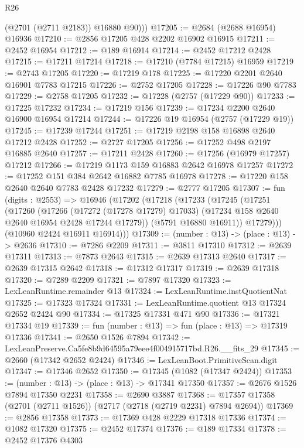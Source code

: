 \begin{lexlean}{R26}
\begin{coremodule}
          (@2701 (@2711 @2183))
          @16880
          @90)))
@17205 := @2684 (@2688 @16954) @16936
@17210 := @2856 @17205 @428 @2202 @16902 @16915
@17211 := @2452 @16954
@17212 := @189 @16914
@17214 := @2452 @17212 @2428
@17215 := @17211 @17214
@17218 := @17210 (@7784 @17215) @16959
@17219 := @2743 @17205
@17220 := @17219 @178
@17225 := @17220 @2201 @2640 @16901 @7783 @17215
@17226 := @2752 @17205
@17228 := @17226 @90 @7783
@17229 := @2758 @17205
@17232 := @17228 (@2757 (@17229 @90))
@17233 := @17225 @17232
@17234 := @17219 @156
@17239 := @17234 @2200 @2640 @16900 @16954 @17214
@17244 := @17226 @19 @16954 (@2757 (@17229 @19))
@17245 := @17239 @17244
@17251 := @17219 @2198 @158 @16898 @2640 @17212 @2428
@17252 := @2727 @17205
@17256 := @17252 @498 @2197 @16885 @2640
@17257 := @17211 @2428
@17260 := @17256 (@16979 @17257) @17212
@17266 := @17219 @1173 @159 @16883 @2642 @16978 @17257
@17272 := @17252 @151 @384 @2642 @16882 @7785 @16978
@17278 := @17220 @158 @2640 @2640 @7783 @2428 @17232
@17279 := @2777 @17205
@17307 := fun (digits : @2553) =>
  @16946
    (@17202
      (@17218
        (@17233
          (@17245
            (@17251
              (@17260
                (@17266
                  (@17272 (@17278 @17279) @17033)
                  (@17234 @158 @2640 @2640 @16954 @2428 @17244 @17279))
                (@5791 @16880 @16911))
              @17279)))
        (@10960 @2424 @16911 @16914)))
@17309 := (number : @13) -> (place : @13) -> @2636
@17310 := @7286 @2209
@17311 := @3811 @17310
@17312 := @2639 @17311
@17313 := @7873 @2643
@17315 := @2639 @17313 @2640
@17317 := @2639 @17315 @2642
@17318 := @17312 @17317
@17319 := @2639 @17318
@17320 := @7289 @2209
@17321 := @7897 @17320
@17323 := LexLeanRuntime.remainder @13
@17324 := LexLeanRuntime.instQuotientNat
@17325 := @17323 @17324
@17331 := LexLeanRuntime.quotient @13 @17324 @2652 @2424 @90
@17334 := @17325 @17331 @471 @90
@17336 := @17321 @17334 @19
@17339 := fun (number : @13) => fun (place : @13) => @17319 @17336
@17341 := @2650 @1526 @7894
@17342 := LexLeanPreserve.Ca5fe8b9d64595a79eee4f004915717bd.R26.__fits_29
@17345 := @2660 (@17342 @2652 @2424)
@17346 := LexLeanBoot.PrimitiveScan.digit
@17347 := @17346 @2652
@17350 := @17345 (@1082 (@17347 @2424))
@17353 := (number : @13) -> (place : @13) -> @17341 @17350
@17357 := @2676 @1526 @7894 @17350 @2231
@17358 := @2690 @3887
@17368 := @17357 @17358 (@2701 (@2711 @1526)) (@2717 (@2718 (@2719 @2231) @7894 @2694))
@17369 := @2856 @17358
@17373 := @17369 @428 @2229 @17318 @17336
@17374 := @1082 @17320
@17375 := @2452 @17374
@17376 := @189 @17334
@17378 := @2452 @17376 @4303

\end{coremodule}
\end{lexlean}
